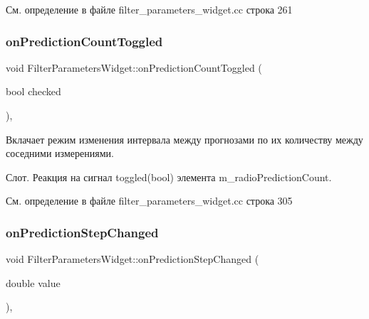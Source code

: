 См. определение в файле filter\+\_\+parameters\+\_\+widget.\+cc строка 261

\hypertarget{class_filter_parameters_widget_af00a1550252f080c7647f3fbf684587b}{}\label{class_filter_parameters_widget_af00a1550252f080c7647f3fbf684587b} 
\subsubsection{\texorpdfstring{on\+Prediction\+Count\+Toggled}{onPredictionCountToggled}}
{\footnotesize\ttfamily void Filter\+Parameters\+Widget\+::on\+Prediction\+Count\+Toggled (\begin{DoxyParamCaption}\item[{bool}]{checked }\end{DoxyParamCaption})\hspace{0.3cm}{\ttfamily [private]}, {\ttfamily [slot]}}



Вклачает режим изменения интервала между прогнозами по их количеству между соседними измерениями. 

Слот. Реакция на сигнал toggled(bool) элемента m\+\_\+radio\+Prediction\+Count. 

См. определение в файле filter\+\_\+parameters\+\_\+widget.\+cc строка 305

\hypertarget{class_filter_parameters_widget_aa78cbb97c3a70babc20c35cf0e6f346a}{}\label{class_filter_parameters_widget_aa78cbb97c3a70babc20c35cf0e6f346a} 
\subsubsection{\texorpdfstring{on\+Prediction\+Step\+Changed}{onPredictionStepChanged}}
{\footnotesize\ttfamily void Filter\+Parameters\+Widget\+::on\+Prediction\+Step\+Changed (\begin{DoxyParamCaption}\item[{double}]{value }\end{DoxyParamCaption})\hspace{0.3cm}{\ttfamily [private]}, {\ttfamily [slot]}}



